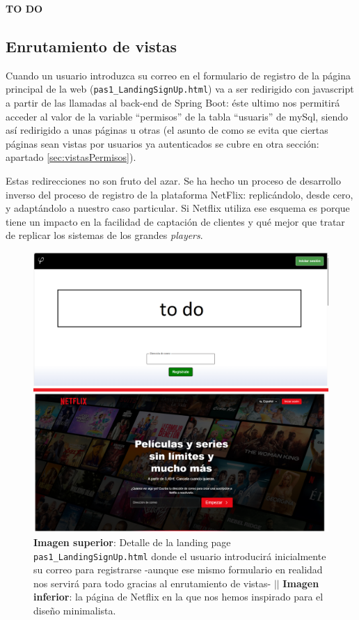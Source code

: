 \documentclass[a4paper,12pt]{report}
\begin{document}
	\textbf{TO DO}
	
	\subsection{Enrutamiento de vistas}
	\label{sec:EnrutamientoDeVistas}
	
	Cuando un usuario introduzca su correo en el formulario de registro de la página principal de la web (\texttt{pas1\_LandingSignUp.html}) va a ser redirigido con javascript a partir de las llamadas al back-end de Spring Boot: éste ultimo nos permitirá acceder al valor de la variable ``permisos'' de la tabla ``usuaris'' de mySql, siendo así redirigido a unas páginas u otras (el asunto de como se evita que ciertas páginas sean vistas por usuarios ya autenticados se cubre en otra sección: apartado \ref{sec:vistasPermisos}).
	
	

	
	Estas redirecciones no son fruto del azar. Se ha hecho un proceso de desarrollo inverso del proceso de registro de la plataforma NetFlix: replicándolo, desde cero, y adaptándolo a nuestro caso particular. Si Netflix utiliza ese esquema es porque tiene un impacto en la facilidad de captación de clientes y qué mejor que tratar de replicar los sistemas de los grandes \textit{players}.
	
	\setlength{\belowcaptionskip}{3pt}
	\FloatBarrier
	\begin{figure}[H]
		\centering
		\includegraphics[width=1\textwidth]{img/landingSignUp.png}
		\caption{\textbf{Imagen superior}: Detalle de la landing page \texttt{pas1\_LandingSignUp.html} donde el usuario introducirá inicialmente su correo para registrarse -aunque ese mismo formulario en realidad nos servirá para todo gracias al enrutamiento de vistas- $||$ \textbf{Imagen inferior}: la página de Netflix en la que nos hemos inspirado para el diseño minimalista.}
		\label{fig:landingSignUpDETALL} 
	\end{figure}
	\FloatBarrier
	
\end{document}
